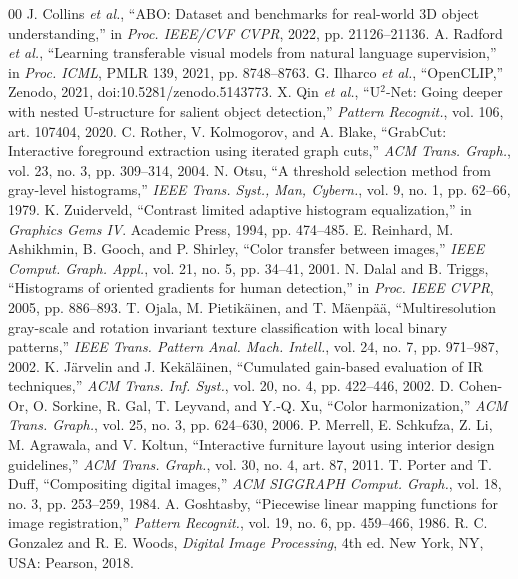 \documentclass[conference]{IEEEtran}
\begin{document}
\begin{thebibliography}{00}
 J. Collins \emph{et al.}, ``ABO: Dataset and benchmarks for real-world 3D object understanding,'' in \emph{Proc. IEEE/CVF CVPR}, 2022, pp. 21126--21136.
 A. Radford \emph{et al.}, ``Learning transferable visual models from natural language supervision,'' in \emph{Proc. ICML}, PMLR 139, 2021, pp. 8748--8763.
 G. Ilharco \emph{et al.}, ``OpenCLIP,'' Zenodo, 2021, doi:10.5281/zenodo.5143773.
 X. Qin \emph{et al.}, ``U$^2$-Net: Going deeper with nested U-structure for salient object detection,'' \emph{Pattern Recognit.}, vol. 106, art. 107404, 2020.
 C. Rother, V. Kolmogorov, and A. Blake, ``GrabCut: Interactive foreground extraction using iterated graph cuts,'' \emph{ACM Trans. Graph.}, vol. 23, no. 3, pp. 309--314, 2004.
 N. Otsu, ``A threshold selection method from gray-level histograms,'' \emph{IEEE Trans. Syst., Man, Cybern.}, vol. 9, no. 1, pp. 62--66, 1979.
 K. Zuiderveld, ``Contrast limited adaptive histogram equalization,'' in \emph{Graphics Gems IV}. Academic Press, 1994, pp. 474--485.
 E. Reinhard, M. Ashikhmin, B. Gooch, and P. Shirley, ``Color transfer between images,'' \emph{IEEE Comput. Graph. Appl.}, vol. 21, no. 5, pp. 34--41, 2001.
 N. Dalal and B. Triggs, ``Histograms of oriented gradients for human detection,'' in \emph{Proc. IEEE CVPR}, 2005, pp. 886--893.
 T. Ojala, M. Pietik\"ainen, and T. M\"aenp\"a\"a, ``Multiresolution gray-scale and rotation invariant texture classification with local binary patterns,'' \emph{IEEE Trans. Pattern Anal. Mach. Intell.}, vol. 24, no. 7, pp. 971--987, 2002.
 K. J\"arvelin and J. Kek\"al\"ainen, ``Cumulated gain-based evaluation of IR techniques,'' \emph{ACM Trans. Inf. Syst.}, vol. 20, no. 4, pp. 422--446, 2002.
 D. Cohen-Or, O. Sorkine, R. Gal, T. Leyvand, and Y.-Q. Xu, ``Color harmonization,'' \emph{ACM Trans. Graph.}, vol. 25, no. 3, pp. 624--630, 2006.
 P. Merrell, E. Schkufza, Z. Li, M. Agrawala, and V. Koltun, ``Interactive furniture layout using interior design guidelines,'' \emph{ACM Trans. Graph.}, vol. 30, no. 4, art. 87, 2011.
 T. Porter and T. Duff, ``Compositing digital images,'' \emph{ACM SIGGRAPH Comput. Graph.}, vol. 18, no. 3, pp. 253--259, 1984.
 A. Goshtasby, ``Piecewise linear mapping functions for image registration,'' \emph{Pattern Recognit.}, vol. 19, no. 6, pp. 459--466, 1986.
 R. C. Gonzalez and R. E. Woods, \emph{Digital Image Processing}, 4th ed. New York, NY, USA: Pearson, 2018.
\end{thebibliography}
\end{document}
